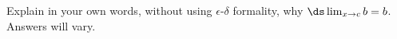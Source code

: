 {Explain in your own words, without using $\epsilon$-$\delta$ formality, why $\ds \lim_{x\to c} b = b$.}
{Answers will vary.
}

